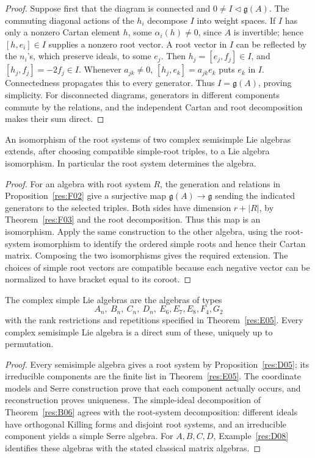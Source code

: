 \begin{proof}
Suppose first that the diagram is connected and
\(0\ne I\triangleleft\mathfrak g(A)\).
The commuting diagonal actions of the \(h_i\) decompose \(I\)
into weight spaces. If \(I\) has only a nonzero Cartan
element \(h\), some \(\alpha_i(h)\ne0\), since \(A\)
is invertible; hence \([h,e_i]\in I\) supplies a nonzero
root vector. A root vector in \(I\) can be reflected by
the \(n_i\)'s, which preserve ideals, to some \(e_j\).
Then \(h_j=[e_j,f_j]\in I\), and
\([h_j,f_j]=-2f_j\in I\). Whenever \(a_{jk}\ne0\),
\([h_j,e_k]=a_{jk}e_k\) puts \(e_k\) in \(I\).
Connectedness propagates this to every generator.
Thus \(I=\mathfrak g(A)\), proving simplicity.
For disconnected diagrams, generators in different components
commute by the relations, and the independent Cartan and
root decomposition makes their sum direct.
\end{proof}

\begin{theorem}\label{res:F01}
An isomorphism of the root systems of two complex semisimple
Lie algebras extends, after choosing compatible simple-root
triples, to a Lie algebra isomorphism. In particular the root
system determines the algebra.
\end{theorem}
\begin{proof}
For an algebra with root system \(R\), the generation and
relations in Proposition~\ref{res:F02} give a surjective map
\(\mathfrak g(A)\to\mathfrak g\) sending the indicated
generators to the selected triples. Both sides have dimension
\(r+|R|\), by Theorem~\ref{res:F03} and the root decomposition.
Thus this map is an isomorphism.
Apply the same construction to the other algebra, using
the root-system isomorphism to identify the ordered simple
roots and hence their Cartan matrix. Composing the two
isomorphisms gives the required extension.
The choices of simple root vectors are compatible because
each negative vector can be normalized to have bracket
equal to its coroot.
\end{proof}

\begin{corollary}\label{res:F04}
The complex simple Lie algebras are the algebras of types
\[
 A_n,\ B_n,\ C_n,\ D_n,\ E_6,E_7,E_8,F_4,G_2
\]
with the rank restrictions and repetitions specified in
Theorem~\ref{res:E05}. Every complex semisimple Lie algebra
is a direct sum of these, uniquely up to permutation.
\end{corollary}
\begin{proof}
Every semisimple algebra gives a root system by
Proposition~\ref{res:D05}; its irreducible components
are the finite list in Theorem~\ref{res:E05}.
The coordinate models and Serre construction prove that
each component actually occurs, and reconstruction proves
uniqueness. The simple-ideal decomposition
of Theorem~\ref{res:B06} agrees with the root-system
decomposition: different ideals have orthogonal Killing
forms and disjoint root systems, and an irreducible
component yields a simple Serre algebra.
For \(A,B,C,D\), Example~\ref{res:D08} identifies these
algebras with the stated classical matrix algebras.
\end{proof}

